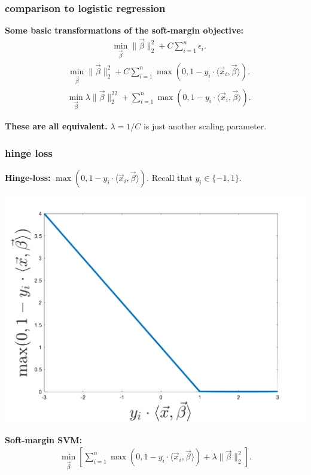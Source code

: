 \documentclass[handout,compress]{beamer}
\begin{document}
\begin{frame}
		\frametitle{comparison to logistic regression}
	\textbf{Some basic transformations of the soft-margin objective:}
	\begin{align*}
	&\min_{\vec{\beta}} \|\vec{\beta}\|_2^2 + C\sum_{i=1}^n\epsilon_i.
	\end{align*}
	\begin{align*}
		&\min_{\vec{\beta}} \|\vec{\beta}\|_2^2 + C\sum_{i=1}^n\max(0,1 -y_i\cdot\langle \vec{x}_i, \vec{\beta}\rangle).
	\end{align*}
	\begin{align*}
	&\min_{\vec{\beta}} \lambda\|\vec{\beta}\|_2^22 + \sum_{i=1}^n\max(0,1 -y_i\cdot\langle \vec{x}_i, \vec{\beta}\rangle).
	\end{align*}
	\begin{center}
		\alert{\textbf{These are all equivalent.}} $\lambda = 1/C$ is just another scaling parameter. 
	\end{center}
\end{frame}


\begin{frame}
	\frametitle{hinge loss}
	\textbf{Hinge-loss:} $\max(0,1-y_i\cdot\langle \vec{x}_i, \vec{\beta}\rangle)$. Recall that $y_i \in \{-1,1\}$. 
	\begin{center}
		\vspace{-1em}
		\includegraphics[width =.5\textwidth]{hinge.png}
	\end{center}
	\textbf{Soft-margin SVM:}
	\begin{align}
	\min_{\vec{\beta}} \left[\sum_{i=1}^n \max(0,1-y_i\cdot\langle \vec{x}_i, \vec{\beta}\rangle) + \lambda \|\vec{\beta}\|_2^2\right].
	\end{align}
\end{frame}
\end{document}

